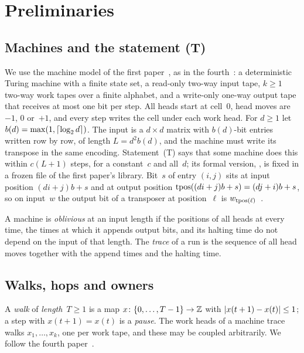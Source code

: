 \section{Preliminaries}\label{sec:prelim}

\subsection{Machines and the statement (T)}\label{sec:prelim-machines}

We use the machine model of the first paper~\cite{FirstPaper2026}, as in the fourth~\cite[Section~2.1]{FourthPaper2026}:
a deterministic Turing machine with a finite state set, a read-only two-way input tape, $k\ge1$ two-way work tapes over a
finite alphabet, and a write-only one-way output tape that receives at most one bit per step. All heads start at
cell~$0$, head moves are $-1$, $0$ or~$+1$, and every step writes the cell under each work head. For $d\ge1$ let
$b(d)=\max(1,\lceil \log_2 d \rceil)$. The input is a $d\times d$ matrix with $b(d)$-bit entries written row by row, of length
$L=d^2b(d)$, and the machine must write its transpose in the same encoding. Statement~(T) says that some machine does
this within $c(L+1)$ steps, for a constant~$c$ and all~$d$; its formal version,
, is fixed in a frozen file of the first paper's library. Bit~$s$ of entry
$(i,j)$ sits at input position $(di+j)b+s$ and at output position $\operatorname{tpos}((di+j)b+s)=(dj+i)b+s$, so on input~$w$ the
output bit of a transposer at position~$\ell$ is $w_{\operatorname{tpos}(\ell)}$~\cite[Section~2.2 and Lemma~2.5]{FirstPaper2026}.

A machine is \emph{oblivious} at an input length if the positions of all heads at every time, the times at which it
appends output bits, and its halting time do not depend on the input of that length. The \emph{trace} of a run is the
sequence of all head moves together with the append times and the halting time.

\subsection{Walks, hops and owners}\label{sec:prelim-walks}

A \emph{walk} of \emph{length}~$T\ge1$ is a map $x\colon\{0,\dots,T-1\}\to\mathbb{Z}$ with $\lvert x(t+1)-x(t) \rvert\le1$; a step with
$x(t+1)=x(t)$ is a \emph{pause}. The work heads of a machine trace walks $x_1,\dots,x_k$, one per work tape, and these may
be coupled arbitrarily. We follow the fourth paper~\cite[Sections~2.2 and~4.4]{FourthPaper2026}.

